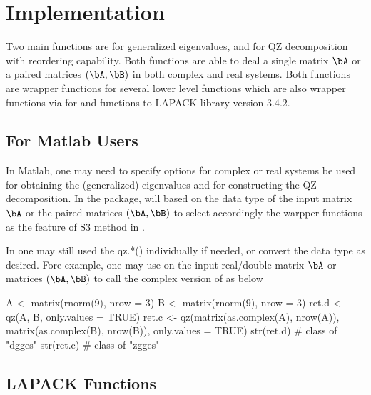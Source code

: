 

\section[Implementation]{Implementation}
\label{sec:implementation}

Two main functions are 
for generalized eigenvalues, and  for QZ decomposition with
reordering capability. Both functions are able to deal a single matrix $\bA$
or a paired matrices $(\bA,\bB)$ in both complex and real systems.
Both functions are wrapper functions for several lower level
 functions  which are also wrapper functions
via 
for  and  functions to LAPACK library 
version 3.4.2.


\subsection[For Matlab Users]{For Matlab Users}
\label{sec:matlabe}

In Matlab,
one may need to specify options for complex or real systems
be used for obtaining the (generalized) eigenvalues and
for constructing the QZ decomposition.
In the  package, 
will based on the data type of the input matrix $\bA$ or 
the paired matrices $(\bA,\bB)$ to select
accordingly the warpper functions 
as the feature of S3 method in .

In  one may still used the {qz.*()} individually if needed,
or convert the data type as desired. 
Fore example, one may use 
on the input real/double matrix $\bA$ or matrices $(\bA, \bB)$
to call the complex version of  as below
\begin{Code}[title=Use complex system via \code{as.complex()}]
A <- matrix(rnorm(9), nrow = 3)
B <- matrix(rnorm(9), nrow = 3)
ret.d <- qz(A, B, only.values = TRUE)
ret.c <- qz(matrix(as.complex(A), nrow(A)),
            matrix(as.complex(B), nrow(B)), only.values = TRUE)
str(ret.d)  # class of "dgges"
str(ret.c)  # class of "zgges"
\end{Code}


\subsection[LAPACK Functions]{LAPACK Functions}
\label{sec:lapack}

